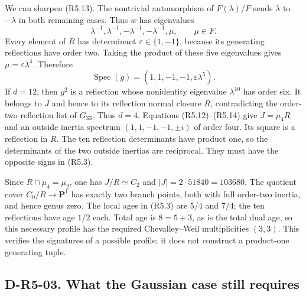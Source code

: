 We can sharpen (R5.13).  The nontrivial automorphism of
$F(\lambda)/F$ sends $\lambda$ to $-\lambda$ in both remaining
cases.  Thus $w$ has eigenvalues
\[
             \lambda^{-1},\lambda^{-1},
             -\lambda^{-1},-\lambda^{-1},\mu,
             \qquad\mu\in F.
\]
Every element of $R$ has determinant $\varepsilon\in\{1,-1\}$,
because its generating reflections have order two.
Taking the product of these five eigenvalues gives
$\mu=\varepsilon\lambda^4$.
Therefore
\[
             \operatorname{Spec}(g)
                    =(1,1,-1,-1,\varepsilon\lambda^5).
                                                               \tag{R5.14}
\]
If $d=12$, then $g^2$ is a reflection whose nonidentity eigenvalue
$\lambda^{10}$ has order six.  It belongs to $J$ and hence to its
reflection normal closure $R$, contradicting the order-two
reflection list of $G_{33}$.  Thus $d=4$.
Equations (R5.12)--(R5.14) give $J=\mu_4R$ and an outside inertia
spectrum $(1,1,-1,-1,\pm i)$ of order four.  Its square is a
reflection in $R$.
The ten reflection determinants have product one, so the determinants
of the two outside inertias are reciprocal.  They must have the
opposite signs in (R5.3).

Since $R\cap\mu_4=\mu_2$, one has $J/R\simeq C_2$ and
$|J|=2\cdot51840=103680$.
The quotient cover $C_0/R\to\mathbf P^1$ has exactly two branch
points, both with full order-two inertia, and hence genus zero.
The local ages in (R5.3) are $5/4$ and $7/4$; the ten reflections
have age $1/2$ each.  Total age is $8=5+3$, as is the total dual
age, so this necessary profile has the required Chevalley--Weil
multiplicities $(3,3)$.
This verifies the signatures of a possible profile; it does not
construct a product-one generating tuple.

\subsection*{D-R5-03. What the Gaussian case still requires}

